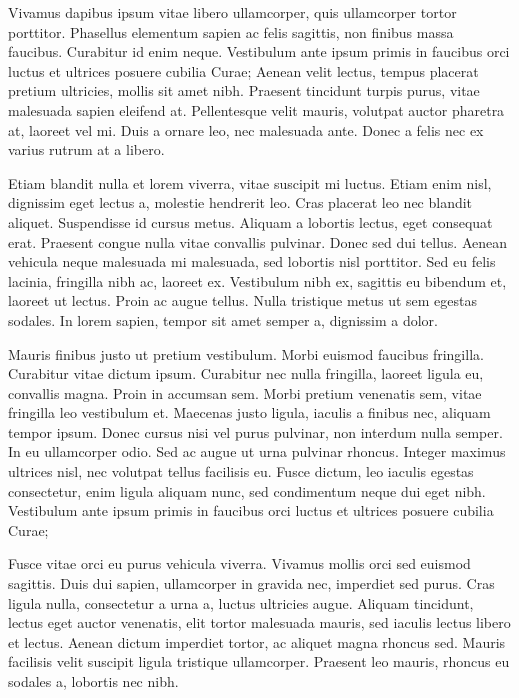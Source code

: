 Vivamus dapibus ipsum vitae libero ullamcorper, quis ullamcorper tortor porttitor. Phasellus elementum sapien ac felis sagittis, non finibus massa faucibus. Curabitur id enim neque. Vestibulum ante ipsum primis in faucibus orci luctus et ultrices posuere cubilia Curae; Aenean velit lectus, tempus placerat pretium ultricies, mollis sit amet nibh. Praesent tincidunt turpis purus, vitae malesuada sapien eleifend at. Pellentesque velit mauris, volutpat auctor pharetra at, laoreet vel mi. Duis a ornare leo, nec malesuada ante. Donec a felis nec ex varius rutrum at a libero.

Etiam blandit nulla et lorem viverra, vitae suscipit mi luctus. Etiam enim nisl, dignissim eget lectus a, molestie hendrerit leo. Cras placerat leo nec blandit aliquet. Suspendisse id cursus metus. Aliquam a lobortis lectus, eget consequat erat. Praesent congue nulla vitae convallis pulvinar. Donec sed dui tellus. Aenean vehicula neque malesuada mi malesuada, sed lobortis nisl porttitor. Sed eu felis lacinia, fringilla nibh ac, laoreet ex. Vestibulum nibh ex, sagittis eu bibendum et, laoreet ut lectus. Proin ac augue tellus. Nulla tristique metus ut sem egestas sodales. In lorem sapien, tempor sit amet semper a, dignissim a dolor.

Mauris finibus justo ut pretium vestibulum. Morbi euismod faucibus fringilla. Curabitur vitae dictum ipsum. Curabitur nec nulla fringilla, laoreet ligula eu, convallis magna. Proin in accumsan sem. Morbi pretium venenatis sem, vitae fringilla leo vestibulum et. Maecenas justo ligula, iaculis a finibus nec, aliquam tempor ipsum. Donec cursus nisi vel purus pulvinar, non interdum nulla semper. In eu ullamcorper odio. Sed ac augue ut urna pulvinar rhoncus. Integer maximus ultrices nisl, nec volutpat tellus facilisis eu. Fusce dictum, leo iaculis egestas consectetur, enim ligula aliquam nunc, sed condimentum neque dui eget nibh. Vestibulum ante ipsum primis in faucibus orci luctus et ultrices posuere cubilia Curae;

Fusce vitae orci eu purus vehicula viverra. Vivamus mollis orci sed euismod sagittis. Duis dui sapien, ullamcorper in gravida nec, imperdiet sed purus. Cras ligula nulla, consectetur a urna a, luctus ultricies augue. Aliquam tincidunt, lectus eget auctor venenatis, elit tortor malesuada mauris, sed iaculis lectus libero et lectus. Aenean dictum imperdiet tortor, ac aliquet magna rhoncus sed. Mauris facilisis velit suscipit ligula tristique ullamcorper. Praesent leo mauris, rhoncus eu sodales a, lobortis nec nibh.

